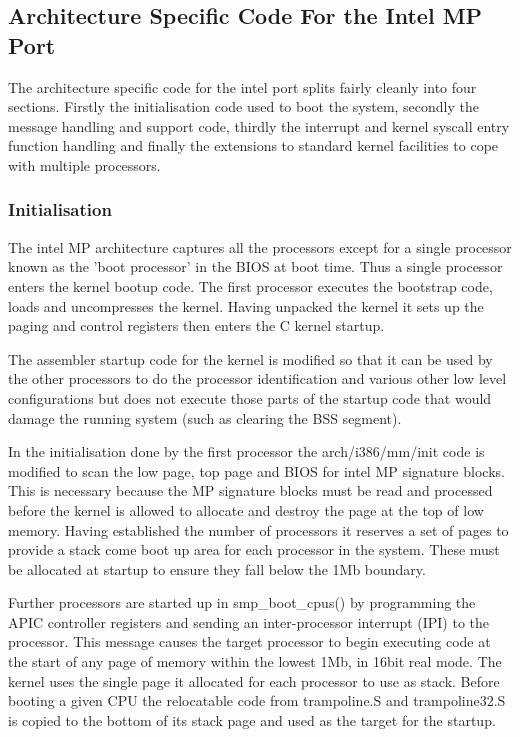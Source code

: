 \documentclass[]{article}
\begin{document}
\subsection{Architecture Specific Code For the Intel MP Port}
The architecture specific code for the intel port splits fairly cleanly 
into four sections. Firstly the initialisation code used to boot the 
system, secondly the message handling and support code, thirdly the 
interrupt and kernel syscall entry function handling and finally the 
extensions to standard kernel facilities to cope with multiple processors.

\subsubsection{Initialisation}	
The intel MP architecture captures all the processors except for a single 
processor known as the 'boot processor' in the BIOS at boot time. Thus a 
single processor enters the kernel bootup code. The first processor 
executes the bootstrap code, loads and uncompresses the kernel. Having 
unpacked the kernel it sets up the paging and control registers then enters 
the C kernel startup.

The assembler startup code for the kernel is modified so that it can be 
used by the other processors to do the processor identification and various 
other low level configurations but does not execute those parts of the 
startup code that would damage the running system (such as clearing the BSS 
segment). 

In the initialisation done by the first processor the arch/i386/mm/init 
code is modified to scan the low page, top page and BIOS for intel MP 
signature blocks. This is necessary because the MP signature blocks must 
be read and processed before the kernel is allowed to allocate and destroy 
the page at the top of low memory. Having established the number of 
processors it reserves a set of pages to provide a stack come boot up area 
for each processor in the system. These must be allocated at startup to 
ensure they fall below the 1Mb boundary.

Further processors are started up in smp\_boot\_cpus() by programming the 
APIC controller registers and sending an inter-processor interrupt (IPI) to 
the processor. This message causes the target processor to begin executing 
code at the start of any page of memory within the lowest 1Mb, in 16bit 
real mode. The kernel uses the single page it allocated for each processor 
to use as stack. Before booting a given CPU the relocatable code from 
trampoline.S and trampoline32.S is copied to the bottom of its stack page 
and used as the target for the startup. 
\end{document}
